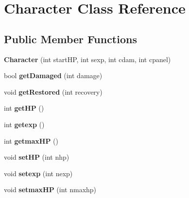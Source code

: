 \hypertarget{class_character}{\section{Character Class Reference}
\label{class_character}
}
\subsection*{Public Member Functions}
\begin{DoxyCompactItemize}
\item 
\hypertarget{class_character_a663231826f9b61c5802228f9b7b743ad}{{\bfseries Character} (int start\-H\-P, int sexp, int cdam, int cpanel)}\label{class_character_a663231826f9b61c5802228f9b7b743ad}

\item 
\hypertarget{class_character_af92b5cb1ab23f30e9aa3371e10e331fe}{bool {\bfseries get\-Damaged} (int damage)}\label{class_character_af92b5cb1ab23f30e9aa3371e10e331fe}

\item 
\hypertarget{class_character_a9e80c446cdcb4651dc321adc80125999}{void {\bfseries get\-Restored} (int recovery)}\label{class_character_a9e80c446cdcb4651dc321adc80125999}

\item 
\hypertarget{class_character_a6f222adddaed0b313094d33700251c6b}{int {\bfseries get\-H\-P} ()}\label{class_character_a6f222adddaed0b313094d33700251c6b}

\item 
\hypertarget{class_character_a0cc4b7dbbaad0f639db856ddfca2e268}{int {\bfseries getexp} ()}\label{class_character_a0cc4b7dbbaad0f639db856ddfca2e268}

\item 
\hypertarget{class_character_a67f56cdab1f01f561073dfcdcf228fda}{int {\bfseries getmax\-H\-P} ()}\label{class_character_a67f56cdab1f01f561073dfcdcf228fda}

\item 
\hypertarget{class_character_a5ee4e596c276d23c486f564c25afe11c}{void {\bfseries set\-H\-P} (int nhp)}\label{class_character_a5ee4e596c276d23c486f564c25afe11c}

\item 
\hypertarget{class_character_afdc04a22ede639e575e6dfc10b15bbcd}{void {\bfseries setexp} (int nexp)}\label{class_character_afdc04a22ede639e575e6dfc10b15bbcd}

\item 
\hypertarget{class_character_ad758a1dde55f9487dccca36ded607a48}{void {\bfseries setmax\-H\-P} (int nmaxhp)}\label{class_character_ad758a1dde55f9487dccca36ded607a48}


\end{DoxyCompactItemize}
